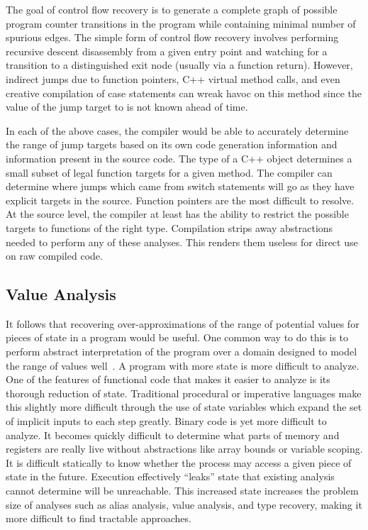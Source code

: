 The goal of control flow recovery is to generate a complete graph of possible program counter transitions in the program while containing minimal number of spurious edges.
The simple form of control flow recovery involves performing recursive descent disassembly from a given entry point and watching for a transition to a distinguished exit node (usually via a function return).
However, indirect jumps due to function pointers, C++ virtual method calls, and even creative compilation of case statements can wreak havoc on this method since the value of the jump target to is not known ahead of time.

In each of the above cases, the compiler would be able to accurately determine the range of jump targets based on its own code generation information and information present in the source code.
The type of a C++ object determines a small subset of legal function targets for a given method.
The compiler can determine where jumps which came from switch statements will go as they have explicit targets in the source.
Function pointers are the most difficult to resolve.
At the source level, the compiler at least has the ability to restrict the possible targets to functions of the right type.
Compilation strips away abstractions needed to perform any of these analyses.
This renders them useless for direct use on raw compiled code.

\subsection{Value Analysis}
\label{sec:valanal}
It follows that recovering over-approximations of the range of potential values for pieces of state in a program would be useful.
One common way to do this is to perform abstract interpretation of the program over a domain designed to model the range of values well~\cite{vsa,wrappedintervals,wrappedintervals2}.
A program with more state is more difficult to analyze.
One of the features of functional code that makes it easier to analyze is its thorough reduction of state.
Traditional procedural or imperative languages make this slightly more difficult through the use of state variables which expand the set of implicit inputs to each step greatly.
Binary code is yet more difficult to analyze.
It becomes quickly difficult to determine what parts of memory and registers are really live without abstractions like array bounds or variable scoping.
It is difficult statically to know whether the process may access a given piece of state in the future.
Execution effectively ``leaks'' state that existing analysis cannot determine will be unreachable.
This increased state increases the problem size of analyses such as alias analysis, value analysis, and type recovery, making it more difficult to find tractable approaches.

